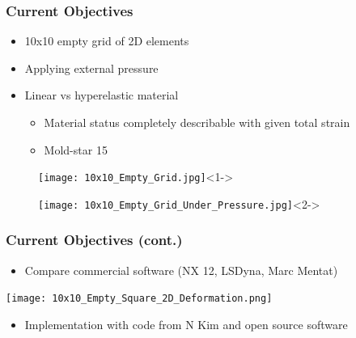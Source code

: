 \documentclass[serif, pdf]{beamer}
\begin{document}
\begin{frame}
    \frametitle{Current Objectives}
    \begin{itemize}
        \item<1-> 10x10 empty grid of 2D elements
        \item<2-> Applying external pressure
        \item<3-> Linear vs hyperelastic material
        \changefontsizes{11pt}
        \begin{itemize}
            \item<4-> Material status completely describable with given total strain
            \item<5-> Mold-star 15
        \end{itemize}
    \end{itemize}
    \begin{subfigure}{.5\textwidth}
        \centering
        \texttt{[image: 10x10\_Empty\_Grid.jpg]}<1->
        \label{fig:basic_model}
    \end{subfigure}%
    \begin{subfigure}{.5\textwidth}
        \centering
        \texttt{[image: 10x10\_Empty\_Grid\_Under\_Pressure.jpg]}<2->
        \label{fig:basic_model_pressure}
    \end{subfigure}
\end{frame}


\begin{frame}
    \frametitle{Current Objectives (cont.)}
    \begin{itemize}
        \item<1-> Compare commercial software (NX 12, LSDyna, Marc Mentat)
    \end{itemize}
    \begin{center}
        \texttt{[image: 10x10\_Empty\_Square\_2D\_Deformation.png]}
    \end{center}
    \begin{itemize}
        \item<2-> Implementation with code from N Kim and open source software
    \end{itemize}
\end{frame}

\end{document}
